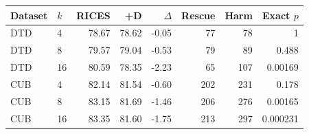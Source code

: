 \begin{tabular}{llrrrrrr}
\toprule
Dataset & $k$ & RICES & +D & $\Delta$ & Rescue & Harm & Exact $p$ \\
\midrule
DTD & 4 & 78.67 & 78.62 & -0.05 & 77 & 78 & 1 \\
DTD & 8 & 79.57 & 79.04 & -0.53 & 79 & 89 & 0.488 \\
DTD & 16 & 80.59 & 78.35 & -2.23 & 65 & 107 & 0.00169 \\
CUB & 4 & 82.14 & 81.54 & -0.60 & 202 & 231 & 0.178 \\
CUB & 8 & 83.15 & 81.69 & -1.46 & 206 & 276 & 0.00165 \\
CUB & 16 & 83.35 & 81.60 & -1.75 & 213 & 297 & 0.000231 \\
\bottomrule
\end{tabular}
